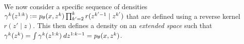 \documentclass[anonymous=false, %
               format=acmsmall, %
               review=true, %
               screen=true, %
               nonacm=true]{acmart}
\theoremstyle{definition}
\begin{document}
We now consider a specific sequence of densities $\gamma^k(z^{1:k}):= p_\theta(x,z^k) \prod_{k'=2}^{k} r(z^{k'-1} \mid z^{k'})$ that are defined using a reverse kernel $r(z' \mid z)$. This then defines a density on an \emph{extended space} such that $\gamma^k(z^k) = \int \gamma^k(z^{1:k}) \: dz^{1:k-1} = p_\theta(x, z^k)$.
\end{document}
